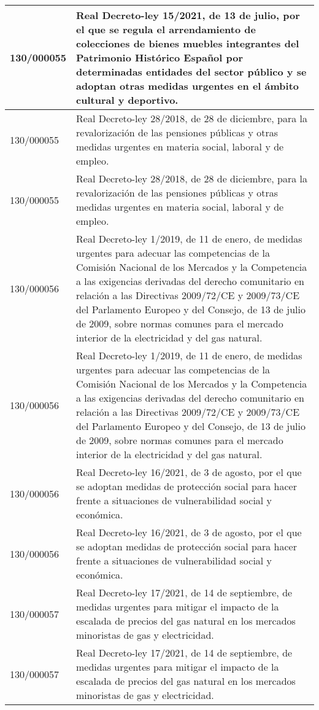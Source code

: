 {\begin{table}[H]
\begin{center}
\begin{tabularx}{\linewidth}{| l | X |}
\hline
130/000055 & Real Decreto-ley 15/2021, de 13 de julio, por el que se regula el arrendamiento de colecciones de bienes muebles integrantes del Patrimonio Histórico Español por determinadas entidades del sector público y se adoptan otras medidas urgentes en el ámbito cultural y deportivo. \\
\hline
130/000055 & Real Decreto-ley 28/2018, de 28 de diciembre, para la revalorización de las pensiones públicas y otras medidas urgentes en materia social, laboral y de empleo. \\
\hline
130/000055 & Real Decreto-ley 28/2018, de 28 de diciembre, para la revalorización de las pensiones públicas y otras medidas urgentes en materia social, laboral y de empleo. \\
\hline
130/000056 & Real Decreto-ley 1/2019, de 11 de enero, de medidas urgentes para adecuar las competencias de la Comisión Nacional de los Mercados y la Competencia a las exigencias derivadas del derecho comunitario en relación a las Directivas 2009/72/CE y 2009/73/CE del Parlamento Europeo y del Consejo, de 13 de julio de 2009, sobre normas comunes para el mercado interior de la electricidad y del gas natural. \\
\hline
130/000056 & Real Decreto-ley 1/2019, de 11 de enero, de medidas urgentes para adecuar las competencias de la Comisión Nacional de los Mercados y la Competencia a las exigencias derivadas del derecho comunitario en relación a las Directivas 2009/72/CE y 2009/73/CE del Parlamento Europeo y del Consejo, de 13 de julio de 2009, sobre normas comunes para el mercado interior de la electricidad y del gas natural. \\
\hline
130/000056 & Real Decreto-ley 16/2021, de 3 de agosto, por el que se adoptan medidas de protección social para hacer frente a situaciones de vulnerabilidad social y económica. \\
\hline
130/000056 & Real Decreto-ley 16/2021, de 3 de agosto, por el que se adoptan medidas de protección social para hacer frente a situaciones de vulnerabilidad social y económica. \\
\hline
130/000057 & Real Decreto-ley 17/2021, de 14 de septiembre, de medidas urgentes para mitigar el impacto de la escalada de precios del gas natural en los mercados minoristas de gas y electricidad. \\
\hline
130/000057 & Real Decreto-ley 17/2021, de 14 de septiembre, de medidas urgentes para mitigar el impacto de la escalada de precios del gas natural en los mercados minoristas de gas y electricidad. \\

\end{tabularx}
\end{center}
\end{table}}
